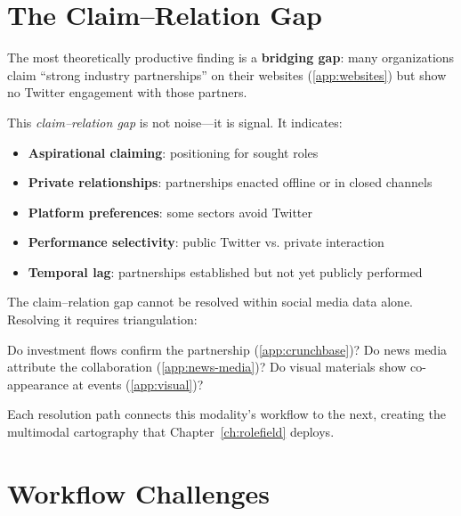 \documentclass[../main.tex]{subfiles}
\begin{document}
\section{The Claim--Relation Gap}
\label{sec:social-gap}

The most theoretically productive finding is a \textbf{bridging gap}:
many organizations claim ``strong industry partnerships'' on their websites
(\cref{app:websites}) but show no Twitter engagement with those partners.

This \emph{claim--relation gap} is not noise---it is signal.
It indicates:

\begin{itemize}[leftmargin=*, itemsep=0.3em]
\item \textbf{Aspirational claiming}: positioning for sought roles
\item \textbf{Private relationships}: partnerships enacted offline or in closed channels
\item \textbf{Platform preferences}: some sectors avoid Twitter
\item \textbf{Performance selectivity}: public Twitter vs. private interaction
\item \textbf{Temporal lag}: partnerships established but not yet publicly performed
\end{itemize}

\begin{criticalbox}
The claim--relation gap cannot be resolved within social media data alone.
Resolving it requires triangulation:

Do investment flows confirm the partnership (\cref{app:crunchbase})?
Do news media attribute the collaboration (\cref{app:news-media})?
Do visual materials show co-appearance at events (\cref{app:visual})?

Each resolution path connects this modality's workflow to the next,
creating the multimodal cartography that Chapter~\ref{ch:rolefield} deploys.
\end{criticalbox}


\section{Workflow Challenges}
\label{sec:social-challenges}
\end{document}
